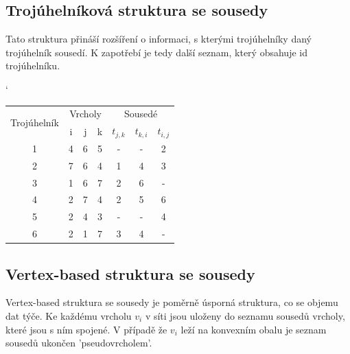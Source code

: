 \documentclass[12pt,a4paper]{article}
\begin{document}
\subsection{Trojúhelníková struktura se sousedy}

Tato struktura přináší rozšíření o informaci, s kterými trojúhelníky daný trojúhelník sousedí. K zapotřebí je tedy další seznam, který obsahuje id trojúhelníku.

\begin{table}[h]
\catcode`
\begin{tabular}{|c||c|c|c||c|c|c|}
\hline
\multirow{2}{*}{Trojúhelník} & \multicolumn{3}{|c|}{Vrcholy} & \multicolumn{3}{|c|}{Sousedé}      \\ \cline{2-7} 
                             & i        & j       & k       & $t_{j,k}$ & $t_{k,i}$ & $t_{i,j}$ \\ \hline \hline
1                            & 4        & 6       & 5       & -         & -         & 2         \\ \hline
2                            & 7        & 6       & 4       & 1         & 4         & 3         \\ \hline
3                            & 1        & 6       & 7       & 2         & 6         & -         \\ \hline
4                            & 2        & 7       & 4       & 2         & 5         & 6         \\ \hline
5                            & 2        & 4       & 3       & -         & -         & 4         \\ \hline
6                            & 2        & 1       & 7       & 3         & 4         & -         \\ \hline
\end{tabular}
\end{table}


\subsection{Vertex-based struktura se sousedy}

Vertex-based struktura se sousedy je poměrně úsporná struktura, co se objemu dat týče. Ke každému vrcholu $v_i$ v síti jsou uloženy do seznamu sousedů vrcholy, které jsou s ním spojené. V případě že $v_i$ leží na konvexním obalu je seznam sousedů ukončen 'pseudovrcholem'. 
\end{document}
